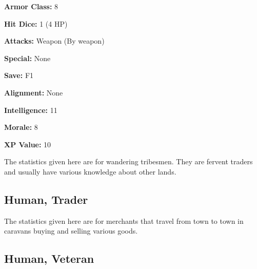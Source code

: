 \begin{multicols*}{2}
{\textbf{Armor Class:} 8

\textbf{Hit Dice:} 1 (4 HP)

\textbf{Attacks:} Weapon (By weapon)

\textbf{Special:} None

\textbf{Save:} F1

\textbf{Alignment:} None

\textbf{Intelligence:} 11

\textbf{Morale:} 8

\textbf{XP Value:} 10}

The statistics given here are for wandering tribesmen. They are fervent traders and usually have various knowledge about other lands.

\subsection{Human, Trader}

The statistics given here are for merchants that travel from town to town in caravans buying and selling various goods.

\subsection{Human, Veteran}
\end{multicols*}
